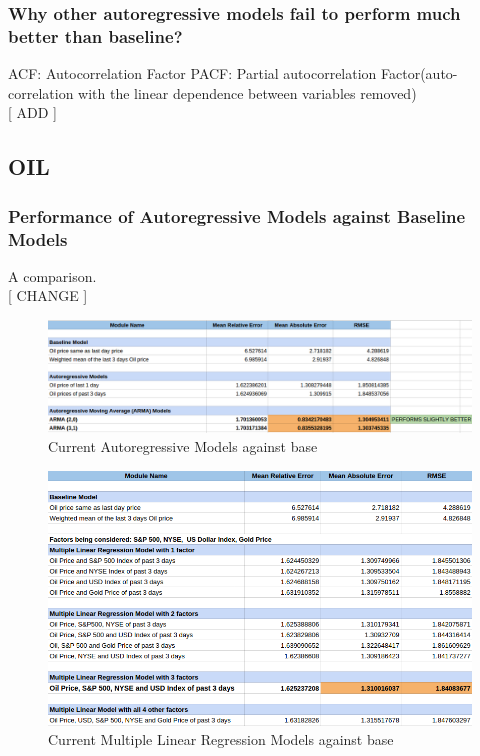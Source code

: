 \documentclass[runningheads]{llncs}
\begin{document}
\subsubsection {Why other autoregressive models fail to perform much better than baseline?}
ACF: Autocorrelation Factor
PACF: Partial autocorrelation Factor(auto-correlation with the linear dependence between variables removed)
\\

[ ADD ]

\subsection {OIL}

\subsubsection {Performance of Autoregressive Models against Baseline Models} A comparison.\\

[ CHANGE ]

\begin{figure}
\centering
\includegraphics[width=\textwidth]{OILAutoAgainstBase_Daily.png}
\caption{Current Autoregressive Models against base}
\label{fig:OILAutoAgainstBase_Daily.png}
\end{figure}

\begin{figure}
\centering
\includegraphics[width=\textwidth]{OILMLRAgainstBase_Daily.png}
\caption{Current Multiple Linear Regression Models against base}
\label{fig:OILMLRAgainstBase_Daily.png}
\end{figure}
\end{document}
